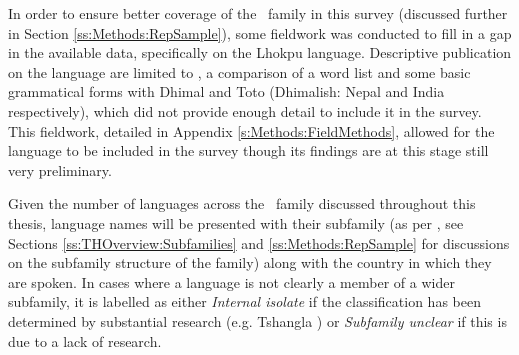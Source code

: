 In order to ensure better coverage of the \lfam\ family in this survey (discussed further in Section \ref{ss:Methods:RepSample}), some fieldwork was conducted to fill in a gap in the available data, specifically on the Lhokpu language. Descriptive publication on the language are limited to , a comparison of a word list and some basic grammatical forms with Dhimal and Toto (Dhimalish: Nepal and India respectively), which did not provide enough detail to include it in the survey. This fieldwork, detailed in Appendix \ref{s:Methods:FieldMethods}, allowed for the language to be included in the survey though its findings are at this stage still very preliminary.  

Given the number of languages across the \lfam\ family discussed throughout this thesis, language names will be presented with their subfamily (as per , see Sections \ref{ss:THOverview:Subfamilies} and \ref{ss:Methods:RepSample} for discussions on the subfamily structure of the family) along with the country in which they are spoken. In cases where a language is not clearly a member of a wider subfamily, it is labelled as either \textit{Internal isolate} if the classification has been determined by substantial research (e.g. Tshangla \cite[Internal isolate: Bhutan][]{Grollmann2020}) or \textit{Subfamily unclear} if this is due to a lack of research.


